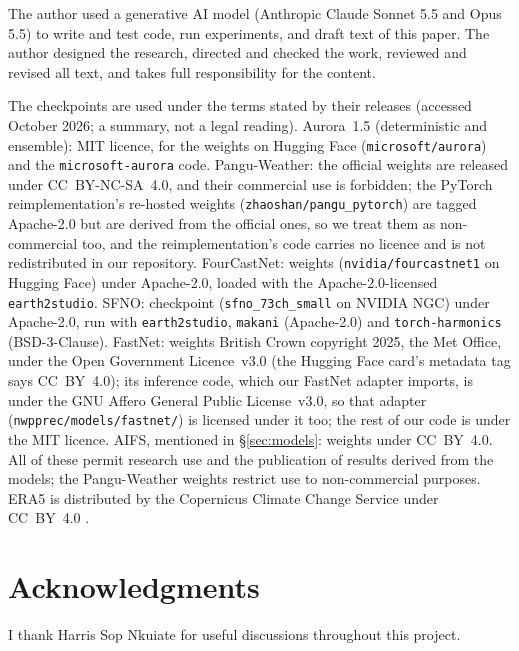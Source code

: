 \documentclass[11pt]{article}
\newif\ifskim \skimfalse
\newcommand{\skim}[1]{\ifskim\textbf{#1}\ \fi}
\begin{document}
\skim{Use of generative AI.}
The author used a generative AI model (Anthropic Claude Sonnet 5.5 and Opus 5.5) to write and test
code, run experiments, and draft text of this paper. The author designed the research, directed and
checked the work, reviewed and revised all text, and takes full responsibility for the content.

\skim{Licences of the checkpoints, the code they need and the data.}
The checkpoints are used under the terms stated by their
releases (accessed October 2026; a summary, not a legal reading).
Aurora~1.5 (deterministic and ensemble): MIT licence, for the weights on
Hugging Face (\texttt{microsoft/aurora}) and the \texttt{microsoft-aurora}
code. Pangu-Weather: the official weights are released under CC~BY-NC-SA~4.0,
and their commercial use is forbidden; the PyTorch reimplementation's
re-hosted weights (\texttt{zhaoshan/pangu\_pytorch}) are tagged
Apache-2.0 but are derived from the official ones, so we treat them as
non-commercial too, and the reimplementation's code carries no licence and
is not redistributed in our repository. FourCastNet: weights
(\texttt{nvidia/fourcastnet1} on Hugging Face) under Apache-2.0, loaded
with the Apache-2.0-licensed \texttt{earth2studio}. SFNO: checkpoint
(\texttt{sfno\_73ch\_small} on NVIDIA NGC) under Apache-2.0, run with
\texttt{earth2studio}, \texttt{makani} (Apache-2.0) and
\texttt{torch-harmonics} (BSD-3-Clause). FastNet: weights British Crown
copyright 2025, the Met Office, under the Open Government Licence~v3.0
(the Hugging Face card's metadata tag says CC~BY~4.0); its inference code,
which our FastNet adapter imports, is under the GNU Affero General Public
License~v3.0, so that adapter (\texttt{nwpprec/models/fastnet/}) is
licensed under it too; the rest of our code is under the MIT licence. AIFS, mentioned in \S\ref{sec:models}: weights
under CC~BY~4.0. All of these permit research use and the publication of
results derived from the models; the Pangu-Weather weights restrict use to
non-commercial purposes. ERA5 is distributed by the Copernicus Climate
Change Service under CC~BY~4.0 \citep{hersbach2020era5}.

\section*{Acknowledgments}
I thank Harris Sop Nkuiate for useful discussions throughout this project.




\appendix

\end{document}
